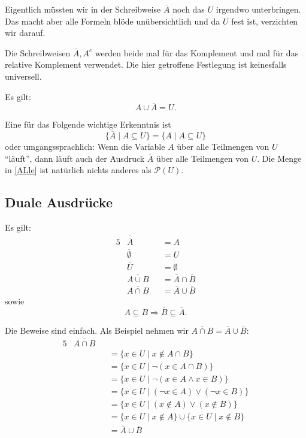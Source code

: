 \documentclass[a4paper]{amsart}
\theoremstyle{definition}
\newcommand{\PP}{\ensuremath{\mathcal{ P }}}
\begin{document}
Eigentlich müssten wir in der Schreibweise $ \overline{A} $ noch das $U$ irgendwo unterbringen. Das macht aber alle Formeln blöde unübersichtlich und da $U$ fest ist, verzichten wir darauf.

Die Schreibweisen $\overline{A}, A^c$ werden beide mal für das Komplement und mal für das relative Komplement verwendet. Die hier getroffene Festlegung ist keinesfalls universell.

Es gilt:
\begin{equation}\label{Alles}
   A \cup \overline{A} = U.
\end{equation}

Eine für das Folgende wichtige Erkenntnis ist
\begin{equation}\label{ALle}
   \{\overline A \mid A \subseteq U \} = \{A \mid A \subseteq U \}
\end{equation}
oder umgangssprachlich: Wenn die Variable $A$ über alle Teilmengen von $U$ "`läuft"', dann läuft auch der Ausdruck $\overline A$ über alle Teilmengen von $U$. Die Menge in \ref{ALle} ist natürlich nichts  anderes als $\PP( U )$. 

\subsection{Duale Ausdrücke}
Es gilt:
\begin{alignat}{5}
   &\overline{ \overline{A} } &&= A\\
   &\overline{ \emptyset    } &&= U\\
   &\overline{ U            } &&= \emptyset\\
   &\overline{ A \cup B     } &&= \overline A \cap \overline B\\
   &\overline{ A \cap B     } &&= \overline A \cup \overline B
\end{alignat}
sowie
\begin{equation}\label{dualSubset}
   A \subseteq B \Rightarrow \overline B \subseteq \overline A.
\end{equation}

Die Beweise sind einfach. Als Beispiel nehmen wir $\overline{ A \cap B     } = \overline A \cup \overline B$:
\begin{alignat}{5}
   &\overline{ A \cap B     }\\
   &&&= \{x \in U \mid x \notin A \cap B \} \\
   &&&= \{x \in U \mid \lnot (x \in A \cap B) \} \\
   &&&= \{x \in U \mid \lnot (x \in A \land x \in B) \} \\
   &&&= \{x \in U \mid (\lnot x \in A) \lor (\lnot x \in B) \} \\
   &&&= \{x \in U \mid (x \notin A) \lor ( x \notin B) \} \\
   &&&= \{x \in U \mid x \notin A \} \cup \{x \in U \mid   x \notin B \} \\
   &&&= \overline A \cup \overline  B
\end{alignat}
\end{document}
